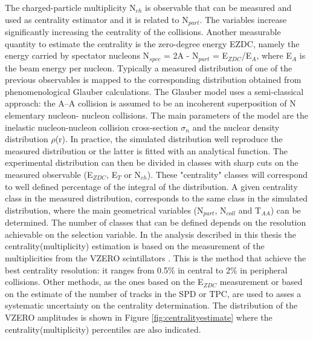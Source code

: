 The charged-particle multiplicity N$_{ch}$ is observable that can be measured and used as centrality estimator and it is related to  N$_{part}$. The variables increase significantly increasing the centrality of the collisions. Another measurable quantity to estimate the centrality is the zero-degree energy EZDC, namely the energy carried by spectator nucleons N$_{spec}$ = 2A - N$_{part}$ = E$_{ZDC}$/E$_{A}$, where E$_{A}$ is the beam energy per nucleon.
Typically a measured distribution of one of the previous observables is mapped to the corresponding distribution obtained from phenomenological Glauber calculations. The Glauber model \cite{cite:glauber,cite:glauber1} uses a semi-classical approach: the A--A collision is assumed to be an incoherent superposition of N elementary nucleon- nucleon collisions. The main parameters of the model are the inelastic nucleon-nucleon collision cross-section $\sigma_{n}$ and the nuclear density distribution $\rho$(r). In practice, the simulated distribution well reproduce the measured distribution or the latter is fitted with an analytical function. The experimental distribution can then be divided in classes with sharp cuts on the measured observable (E$_{ZDC}$, E$_{T}$ or N$_{ch}$). These "centrality" classes will correspond to well defined percentage of the integral of the distribution. A given centrality class in the measured distribution, corresponds to the same class in the simulated distribution, where the main geometrical variables (N$_{part}$, N$_{coll}$ and T$_{AA}$) can be determined. The number of classes that can be defined depends on the resolution achievable on the selection variable.
In the analysis described in this thesis the centrality(multiplicity) estimation is based on the measurement of the multiplicities from the VZERO scintillators \cite{cite:centralitypPb}\cite{cite:centralityPbPb}. This is the method that achieve the best centrality resolution: it ranges from 0.5\% in central to 2\% in peripheral collisions. Other methods, as the ones based on the E$_{ZDC}$ measurement or based on the estimate of the number of tracks in the SPD or TPC, are used to asses a systematic uncertainty on the centrality determination.
The distribution of the VZERO amplitudes is shown in Figure \ref{fig:centralityestimate} where the centrality(multiplicity) percentiles are also indicated. 


